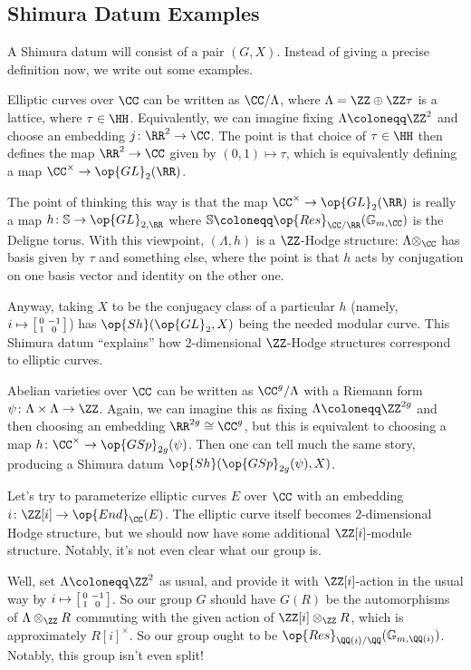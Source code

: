 \documentclass{article}
\begin{document}
\subsection{Shimura Datum Examples}
A Shimura datum will consist of a pair $(G,X)$. Instead of giving a precise definition now, we write out some examples.
\begin{example}
	Elliptic curves over $\CC$ can be written as $\CC/\Lambda$, where $\Lambda=\ZZ\oplus\ZZ\tau$ is a lattice, where $\tau\in\HH$. Equivalently, we can imagine fixing $\Lambda\coloneqq\ZZ^2$ and choose an embedding $j\colon\RR^2\to\CC$. The point is that choice of $\tau\in\HH$ then defines the map $\RR^2\to\CC$ given by $(0,1)\mapsto\tau$, which is equivalently defining a map $\CC^\times\to\op{GL}_2(\RR)$.

	The point of thinking this way is that the map $\CC^\times\to\op{GL}_2(\RR)$ is really a map $h\colon\mathbb S\to\op{GL}_{2,\RR}$ where $\mathbb S\coloneqq\op{Res}_{\CC/\RR}(\mathbb G_{m,\CC})$ is the Deligne torus. With this viewpoint, $(\Lambda,h)$ is a $\ZZ$-Hodge structure: $\Lambda\otimes_\CC$ has basis given by $\tau$ and something else, where the point is that $h$ acts by conjugation on one basis vector and identity on the other one.

	Anyway, taking $X$ to be the conjugacy class of a particular $h$ (namely, $i\mapsto\begin{bsmallmatrix}
		0 & -1 \\ 1 & 0
	\end{bsmallmatrix}$) has $\op{Sh}({\op{GL}_2},X)$ being the needed modular curve. This Shimura datum ``explains'' how $2$-dimensional $\ZZ$-Hodge structures correspond to elliptic curves.
\end{example}
\begin{example}
	Abelian varieties over $\CC$ can be written as $\CC^g/\Lambda$ with a Riemann form $\psi\colon\Lambda\times\Lambda\to\ZZ$. Again, we can imagine this as fixing $\Lambda\coloneqq\ZZ^{2g}$ and then choosing an embedding $\RR^{2g}\cong\CC^g$, but this is equivalent to choosing a map $h\colon\CC^\times\to\op{GSp}_{2g}(\psi)$. Then one can tell much the same story, producing a Shimura datum $\op{Sh}({\op{GSp}_{2g}(\psi)},X)$.
\end{example}
\begin{example} \label{ex:non-split-sh}
	Let's try to parameterize elliptic curves $E$ over $\CC$ with an embedding $i\colon\ZZ[i]\to\op{End}_\CC(E)$. The elliptic curve itself becomes $2$-dimensional Hodge structure, but we should now have some additional $\ZZ[i]$-module structure. Notably, it's not even clear what our group is.

	Well, set $\Lambda\coloneqq\ZZ^2$ as usual, and provide it with $\ZZ[i]$-action in the usual way by $i\mapsto\begin{bsmallmatrix}
		0 & -1 \\ 1 & 0
	\end{bsmallmatrix}$. So our group $G$ should have $G(R)$ be the automorphisms of $\Lambda\otimes_\ZZ R$ commuting with the given action of $\ZZ[i]\otimes_\ZZ R$, which is approximately $R[i]^\times$. So our group ought to be $\op{Res}_{\QQ(i)/\QQ}(\mathbb G_{m,\QQ(i)})$. Notably, this group isn't even split!
\end{example}
\end{document}
